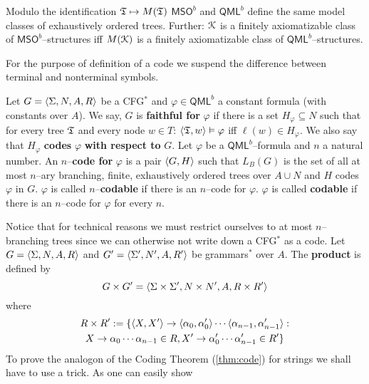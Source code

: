 \begin{cor}
\label{cor:mqlb} Modulo the identification $\mathfrak{T} \mapsto M(\mathfrak{T})$
$\mathsf{MSO}^b$ and $\mathsf{QML}^b$ define the same model
classes of exhaustively ordered trees. Further: $\mathcal{K}$ is a
finitely axiomatizable class of $\mathsf{MSO}^b$--struc\-tu\-res 
iff $M(\mathcal{K})$ is a finitely axiomatizable class of
$\mathsf{QML}^b$--structures.
\end{cor}
For the purpose of definition of a code we suspend the difference
between terminal and nonterminal symbols.
\begin{defn}
Let $G = \langle \Sigma, N,A,R\rangle$ be a CFG$^{\ast}$
and $\varphi \in \mathsf{QML}^b$ a constant formula (with constants
over $A$). We say, $G$ is \textbf{faithful for} $\varphi$ if there is a
set $H_{\varphi} \subseteq N$ such that for every tree $\mathfrak{T}$ and
every node $w \in T$: $\langle \mathfrak{T}, w\rangle \vDash \varphi$ iff
$\ell(w) \in H_{\varphi}$. We also say that $H_{\varphi}$
\textbf{codes} $\varphi$ \textbf{with respect to} $G$.
Let $\varphi$ be a $\mathsf{QML}^b$--formula and $n$ a
natural number. An $n$--\textbf{code for} $\varphi$ is a pair
$\langle G, H\rangle$ such that $L_B(G)$ is the set of all at most
$n$--ary branching, finite, exhaustively ordered trees over
$A \cup N$ and $H$ codes $\varphi$ in $G$. $\varphi$ is called
$n$--\textbf{codable} 
if there is an $n$--code for $\varphi$.  $\varphi$ is called 
\textbf{codable} if there is an $n$--code
for $\varphi$ for every $n$.
\end{defn}
Notice that for technical reasons we must restrict ourselves
to at most $n$--branching trees since we can otherwise not write
down a CFG$^{\ast}$ as a code. Let
$G = \langle \Sigma, N, A, R\rangle$ and $G' = \langle \Sigma', N', A, R'\rangle$
be grammars$^{\ast}$ over $A$. 
The \textbf{product} is defined by
\begin{equation}
G \times G' = \langle \Sigma\times\Sigma', N \times N', A, R \times R'\rangle
\end{equation}
where
\begin{multline}
R \times R' := 
     \{\langle X,X'\rangle \rightarrow \langle \alpha_0, \alpha'_0\rangle \dotsb
    \langle \alpha_{n-1},\alpha'_{n-1}\rangle : \\
    X \rightarrow \alpha_0\dotsb \alpha_{n-1} \in R,
    X' \rightarrow \alpha'_0\dotsb \alpha'_{n-1} \in R'\} 
\end{multline}
To prove the analogon of the Coding Theorem (\ref{thm:code}) for 
strings we shall have to use a trick. As one can easily show
